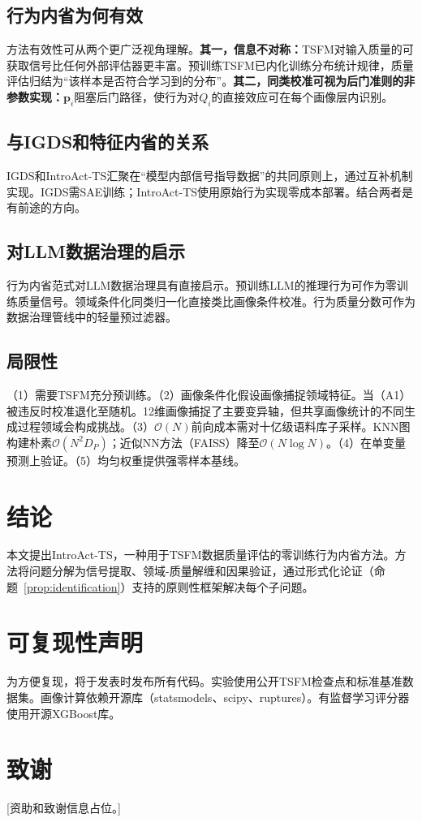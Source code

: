 \documentclass{article}
\begin{document}
\subsection{行为内省为何有效}

方法有效性可从两个更广泛视角理解。\textbf{其一，信息不对称：}TSFM对输入质量的可获取信号比任何外部评估器更丰富。预训练TSFM已内化训练分布统计规律，质量评估归结为“该样本是否符合学习到的分布”。\textbf{其二，同类校准可视为后门准则的非参数实现：}$\mathbf{p}_i$阻塞后门路径，使行为对$Q_i$的直接效应可在每个画像层内识别。

\subsection{与IGDS和特征内省的关系}

IGDS和IntroAct-TS汇聚在“模型内部信号指导数据”的共同原则上，通过互补机制实现。IGDS需SAE训练；IntroAct-TS使用原始行为实现零成本部署。结合两者是有前途的方向。

\subsection{对LLM数据治理的启示}

行为内省范式对LLM数据治理具有直接启示。预训练LLM的推理行为可作为零训练质量信号。领域条件化同类归一化直接类比画像条件校准。行为质量分数可作为数据治理管线中的轻量预过滤器。

\subsection{局限性}

（1）需要TSFM充分预训练。（2）画像条件化假设画像捕捉领域特征。当（A1）被违反时校准退化至随机。12维画像捕捉了主要变异轴，但共享画像统计的不同生成过程领域会构成挑战。（3）$\mathcal{O}(N)$前向成本需对十亿级语料库子采样。KNN图构建朴素$\mathcal{O}(N^2 D_P)$；近似NN方法（FAISS）降至$\mathcal{O}(N \log N)$。（4）在单变量预测上验证。（5）均匀权重提供强零样本基线。

\section{结论}

本文提出IntroAct-TS，一种用于TSFM数据质量评估的零训练行为内省方法。方法将问题分解为信号提取、领域-质量解缠和因果验证，通过形式化论证（命题~\ref{prop:identification}）支持的原则性框架解决每个子问题。

\section*{可复现性声明}
为方便复现，将于发表时发布所有代码。实验使用公开TSFM检查点和标准基准数据集。画像计算依赖开源库（statsmodels、scipy、ruptures）。有监督学习评分器使用开源XGBoost库。

\section*{致谢}
[资助和致谢信息占位。]



\end{document}
